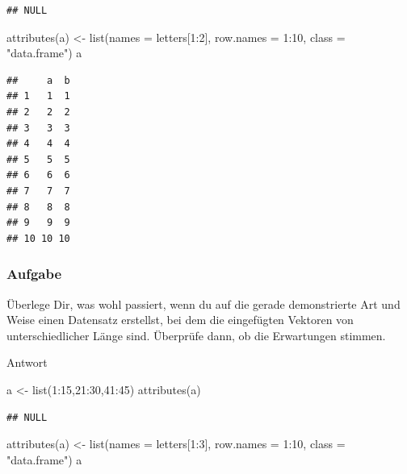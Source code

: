\documentclass[
]{book}
\newenvironment{Shaded}{\begin{snugshade}}{\end{snugshade}}
\newcommand{\AttributeTok}[1]{\textcolor[rgb]{0.77,0.63,0.00}{#1}}
\newcommand{\DecValTok}[1]{\textcolor[rgb]{0.00,0.00,0.81}{#1}}
\newcommand{\FunctionTok}[1]{\textcolor[rgb]{0.00,0.00,0.00}{#1}}
\newcommand{\NormalTok}[1]{#1}
\newcommand{\OtherTok}[1]{\textcolor[rgb]{0.56,0.35,0.01}{#1}}
\newcommand{\SpecialCharTok}[1]{\textcolor[rgb]{0.00,0.00,0.00}{#1}}
\newcommand{\StringTok}[1]{\textcolor[rgb]{0.31,0.60,0.02}{#1}}
\begin{document}
\begin{verbatim}
## NULL
\end{verbatim}

\begin{Shaded}
\begin{Highlighting}[]
\FunctionTok{attributes}\NormalTok{(a) }\OtherTok{\textless{}{-}} \FunctionTok{list}\NormalTok{(}\AttributeTok{names =}\NormalTok{ letters[}\DecValTok{1}\SpecialCharTok{:}\DecValTok{2}\NormalTok{],}
                      \AttributeTok{row.names =} \DecValTok{1}\SpecialCharTok{:}\DecValTok{10}\NormalTok{,}
                      \AttributeTok{class =} \StringTok{"data.frame"}\NormalTok{)}
\NormalTok{a}
\end{Highlighting}
\end{Shaded}

\begin{verbatim}
##     a  b
## 1   1  1
## 2   2  2
## 3   3  3
## 4   4  4
## 5   5  5
## 6   6  6
## 7   7  7
## 8   8  8
## 9   9  9
## 10 10 10
\end{verbatim}

\hypertarget{aufgabe-6}{%
\subsubsection{Aufgabe}\label{aufgabe-6}}

Überlege Dir, was wohl passiert, wenn du auf die gerade demonstrierte Art und Weise einen Datensatz erstellst, bei dem die eingefügten Vektoren von unterschiedlicher Länge sind.
Überprüfe dann, ob die Erwartungen stimmen.

Antwort

\begin{Shaded}
\begin{Highlighting}[]
\NormalTok{a }\OtherTok{\textless{}{-}} \FunctionTok{list}\NormalTok{(}\DecValTok{1}\SpecialCharTok{:}\DecValTok{15}\NormalTok{,}\DecValTok{21}\SpecialCharTok{:}\DecValTok{30}\NormalTok{,}\DecValTok{41}\SpecialCharTok{:}\DecValTok{45}\NormalTok{)}
\FunctionTok{attributes}\NormalTok{(a)}
\end{Highlighting}
\end{Shaded}

\begin{verbatim}
## NULL
\end{verbatim}

\begin{Shaded}
\begin{Highlighting}[]
\FunctionTok{attributes}\NormalTok{(a) }\OtherTok{\textless{}{-}} \FunctionTok{list}\NormalTok{(}\AttributeTok{names =}\NormalTok{ letters[}\DecValTok{1}\SpecialCharTok{:}\DecValTok{3}\NormalTok{],}
                      \AttributeTok{row.names =} \DecValTok{1}\SpecialCharTok{:}\DecValTok{10}\NormalTok{,}
                      \AttributeTok{class =} \StringTok{"data.frame"}\NormalTok{)}
\NormalTok{a}
\end{Highlighting}
\end{Shaded}
\end{document}
